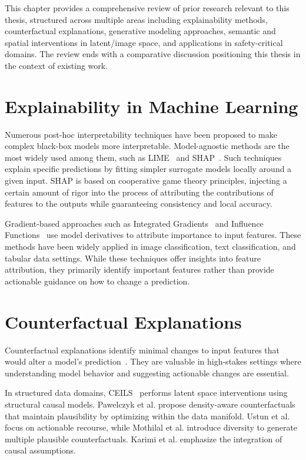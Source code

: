 This chapter provides a comprehensive review of prior research relevant to this thesis, structured across multiple areas including explainability methods, counterfactual explanations, generative modeling approaches, semantic and spatial interventions in latent/image space, and applications in safety-critical domains. The review ends with a comparative discussion positioning this thesis in the context of existing work.



\section{Explainability in Machine Learning}
Numerous post-hoc interpretability techniques have been proposed to make complex black-box models more interpretable. Model-agnostic methods are the most widely used among them, such as LIME~\cite{Ribeiro2018} and SHAP~\cite{lundberg2017unifiedapproachinterpretingmodel}. Such techniques explain specific predictions by fitting simpler surrogate models locally around a given input. SHAP is based on cooperative game theory principles, injecting a certain amount of rigor into the process of attributing the contributions of features to the outputs while guaranteeing consistency and local accuracy.

Gradient-based approaches such as Integrated Gradients~\cite{8237336} and Influence Functions~\cite{pmlr-v70-koh17a} use model derivatives to attribute importance to input features. These methods have been widely applied in image classification, text classification, and tabular data settings. While these techniques offer insights into feature attribution, they primarily identify important features rather than provide actionable guidance on how to change a prediction.


\section{Counterfactual Explanations}
Counterfactual explanations identify minimal changes to input features that would alter a model's prediction~\cite{wachter2018CE}. They are valuable in high-stakes settings where understanding model behavior and suggesting actionable changes are essential.

In structured data domains, CEILS~\cite{crupi2021counterfactualexplanationsinterventionslatent} performs latent space interventions using structural causal models. Pawelczyk et al.\cite{Pawelczyk_2020} propose density-aware counterfactuals that maintain plausibility by optimizing within the data manifold. Ustun et al.\cite{ustun2019actionable} focus on actionable recourse, while Mothilal et al.\cite{DBLP:journals/corr/abs-1905-07697} introduce diversity to generate multiple plausible counterfactuals. Karimi et al.\cite{karimi2020algorithmic} emphasize the integration of causal assumptions.


